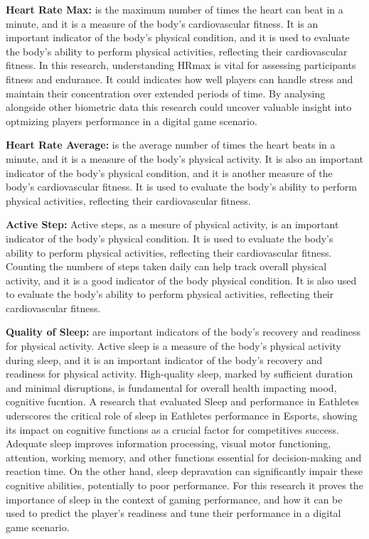 \textbf{Heart Rate Max:} is the maximum number of times the heart can beat in a minute, and it is a measure of the body's cardiovascular fitness. It is an important indicator of the body's physical condition, and it is used to 
evaluate the body's ability to perform physical activities, reflecting their cardiovascular fitness. In this research, understanding HRmax is vital for assessing participants fitness and endurance.
It could indicates how well players can handle stress and maintain their concentration over extended periods of time. By analysing alongside other biometric data this research could
uncover valuable insight into optmizing players performance in a digital game scenario.

\textbf{Heart Rate Average:} is the average number of times the heart beats in a minute, and it is a measure of the body's physical activity. It is also an important indicator of the body's physical condition, 
and it is another measure of the body's cardiovascular fitness. It is used to evaluate the body's ability to perform physical activities, reflecting their cardiovascular fitness.

\textbf{Active Step:} Active steps, as a mesure of physical activity, is an important indicator of the body's physical condition. It is used to evaluate the body's ability to perform
physical activities, reflecting their cardiovascular fitness. Counting the numbers of steps taken daily can help track overall physical activity, and it is a good indicator of the body
physical condition. It is also used to evaluate the body's ability to perform physical activities, reflecting their cardiovascular fitness.
 

\textbf{Quality of Sleep:} are important indicators of the body's recovery and readiness for physical activity. Active sleep is a measure of the body's physical activity during sleep, 
and it is an important indicator of the body's recovery and readiness for physical activity. High-quality sleep, marked by sufficient duration and minimal disruptions, is fundamental for 
overall health impacting mood, cognitive fucntion.  A research that evaluated Sleep and performance in Eathletes \cite{BONNAR2019647} uderscores the critical role of sleep in Eathletes performance in Esports, 
showing its impact on cognitive functions as a crucial factor for competitives success. Adequate sleep improves information processing, visual motor functioning, attention, working memory, and other functions 
essential for decision-making and reaction time. On the other hand, sleep depravation can significantly impair these cognitive abilities, potentially to poor performance. For this research it
proves the importance of sleep in the context of gaming performance, and how it can be used to predict the player's readiness and tune their performance in a digital game scenario.









